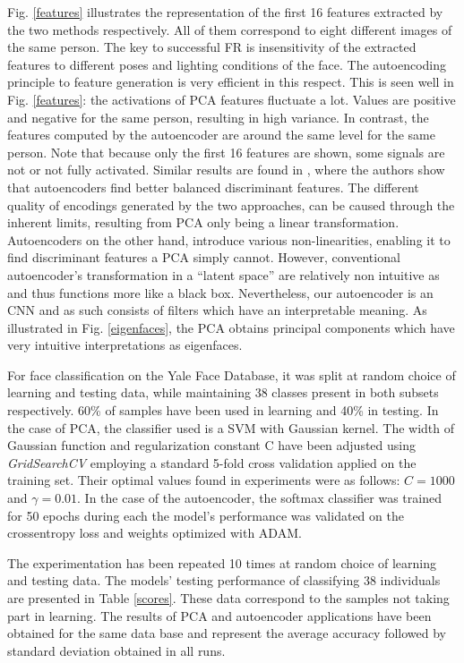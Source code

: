 Fig. \ref{features} illustrates the representation of the first 16 features
extracted by the two methods respectively. All of them correspond to eight
different images of the same person. The key to successful FR is insensitivity
of the extracted features to different poses and lighting conditions of the
face. The autoencoding principle to feature generation is very efficient in this
respect. This is seen well in Fig. \ref{features}: the activations of PCA
features fluctuate a lot. Values are positive and negative for the same person,
resulting in  high variance. In contrast, the features computed by the
autoencoder are around the same level for the same person. Note that because
only the first 16 features are shown, some signals are not or not fully
activated. Similar results are found in \cite{siwek2017autoencoder}, where the
authors show that autoencoders find better balanced discriminant features. The
different quality of encodings generated by the two approaches, can be caused
through the inherent limits, resulting from PCA only being a linear
transformation. Autoencoders on the other hand, introduce various
non-linearities, enabling it to find discriminant features a PCA simply cannot.
However, conventional autoencoder's transformation in a ``latent space'' are
relatively non intuitive as and thus functions more like a black box.
Nevertheless, our autoencoder is an CNN and as such consists of filters which
have an interpretable meaning. As illustrated in Fig. \ref{eigenfaces}, the PCA
obtains principal components which have very intuitive interpretations as
eigenfaces.

For face classification on the Yale Face Database, it was split at random choice
of learning and testing data, while maintaining 38 classes present in both
subsets respectively. 60\% of samples have been used in learning and 40\% in
testing. In the case of PCA, the classifier used is a SVM with Gaussian kernel.
The width of Gaussian function and regularization constant C have been adjusted
using \textit{GridSearchCV} employing a standard 5-fold cross validation applied
on the training set. Their optimal values found in experiments were as follows:
$C=1000$ and $\gamma=0.01$. In the case of the autoencoder, the softmax
classifier was trained for 50 epochs during each the model's performance was
validated on the crossentropy loss and weights optimized with ADAM.

The experimentation has been repeated 10 times at random choice of learning and
testing data. The models' testing performance of classifying 38 individuals 
are presented in Table \ref{scores}. These data correspond to the samples not 
taking part in learning. The results of PCA and autoencoder applications have 
been obtained for the same data base \cite{yalefaceB}\cite{yalefaceBcropped} and
represent the average accuracy followed by standard deviation obtained in all 
runs.

